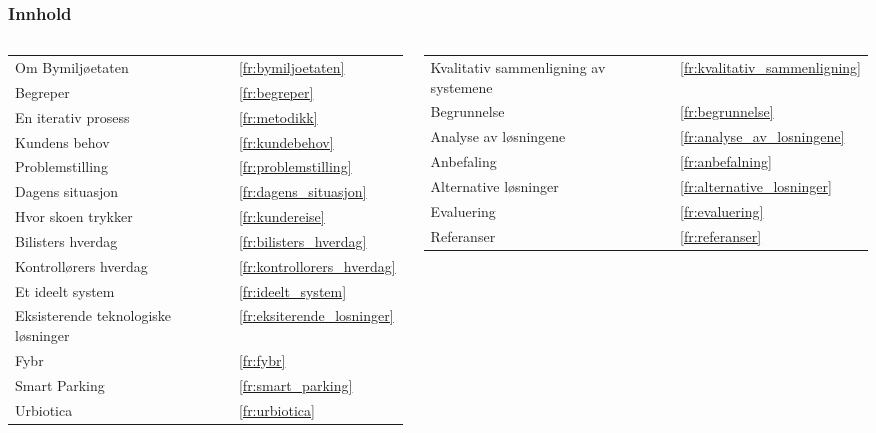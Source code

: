 \documentclass[xetex]{beamer}
\begin{document}
\begin{frame}
	\frametitle{Innhold}
	\begin{columns}[T]
		\begin{column}{0.5\textwidth}
			\begin{tabular}{p{4.2cm}l}
				Om Bymiljøetaten						& \ref{fr:bymiljoetaten} \\ [0.5em]
				Begreper								& \ref{fr:begreper} \\ [0.5em]
				En iterativ prosess						& \ref{fr:metodikk} \\ [0.5em]
				Kundens behov							& \ref{fr:kundebehov} \\[0.5em]
				Problemstilling							& \ref{fr:problemstilling} \\ [0.5em]
				Dagens situasjon						& \ref{fr:dagens_situasjon} \\ [0.5em]
				Hvor skoen trykker						& \ref{fr:kundereise} \\ [0.5em]
				{\tiny\hspace{1em}Bilisters hverdag} & \ref{fr:bilisters_hverdag}\\ [0.5em]
				{\tiny\hspace{1em}Kontrollørers hverdag} & \ref{fr:kontrollorers_hverdag}\\ [0.5em]
				Et ideelt system 						& \ref{fr:ideelt_system} \\[0.5em]
				Eksisterende teknologiske løsninger 	& \ref{fr:eksiterende_losninger} \\[0.5em]
				{\tiny \hspace{1em}\alert{Fybr}} 					& \ref{fr:fybr} \\ [0.5em]
				{\tiny\hspace{1em}\alert{Smart Parking}} 			& \ref{fr:smart_parking} \\ [0.5em]
				{\tiny\hspace{1em}\alert{Urbiotica}} 				& \ref{fr:urbiotica} \\ [0.5em]
				
			\end{tabular}
		\end{column}
		\begin{column}{0.5\textwidth}
			\begin{tabular}{p{4.2cm}l}
				Kvalitativ sammenligning av systemene	& \ref{fr:kvalitativ_sammenligning} \\ [0.5em]
				{\tiny\hspace{1em}Begrunnelse}	& \ref{fr:begrunnelse} \\ [0.5em]
				{\tiny\hspace{1em}Analyse av løsningene}	& \ref{fr:analyse_av_losningene} \\ [0.5em]
				Anbefaling								& \ref{fr:anbefalning} \\ [0.5em]
				Alternative løsninger 					& \ref{fr:alternative_losninger} \\[0.5em]
				Evaluering 								& \ref{fr:evaluering} \\ [0.5em]
				Referanser								& \ref{fr:referanser} \\ [0.5em]
			\end{tabular}
			

\end{column}
\end{columns}
\end{frame}
\end{document}
